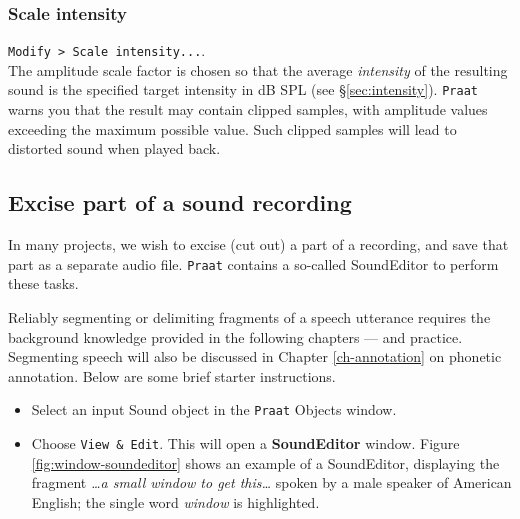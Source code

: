 \documentclass[
]{book}
\begin{document}
\subsubsection{Scale intensity}\label{scale-intensity}

\texttt{Modify\ \textgreater{}\ Scale\ intensity...}.\\
The amplitude scale factor is chosen so that the average \emph{intensity} of the resulting sound is the specified target intensity in dB SPL (see §\ref{sec:intensity}). \texttt{Praat} warns you that the result may contain clipped samples, with amplitude values exceeding the maximum possible value. Such clipped samples will lead to distorted sound when played back.

\subsection{Excise part of a sound recording}\label{sec:praatsoundeditor}

In many projects, we wish to excise (cut out) a part of a recording, and save that part as a separate audio file.
\texttt{Praat} contains a so-called SoundEditor to perform these tasks.

\label{box-segmenting}
Reliably segmenting or delimiting fragments of a speech utterance requires the background knowledge provided in the following chapters --- and practice. Segmenting speech will also be discussed in Chapter \ref{ch-annotation} on phonetic annotation. Below are some brief starter instructions.

\label{box-soundeditor}
\begin{itemize}
\item
  Select an input Sound object in the \texttt{Praat} Objects window.
\item
  Choose \texttt{View\ \&\ Edit}.
  This will open a \textbf{SoundEditor} window.
  Figure \ref{fig:window-soundeditor} shows an example of a SoundEditor, displaying the fragment \emph{\ldots a small window to get this\ldots{}} spoken by a male speaker of American English; the single word \emph{window} is highlighted.
\end{itemize}
\end{document}
